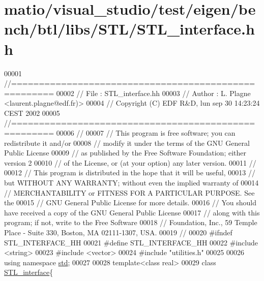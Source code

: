 \hypertarget{matio_2visual__studio_2test_2eigen_2bench_2btl_2libs_2_s_t_l_2_s_t_l__interface_8hh_source}{}\section{matio/visual\+\_\+studio/test/eigen/bench/btl/libs/\+S\+T\+L/\+S\+T\+L\+\_\+interface.hh}
\label{matio_2visual__studio_2test_2eigen_2bench_2btl_2libs_2_s_t_l_2_s_t_l__interface_8hh_source}

\begin{DoxyCode}
00001 \textcolor{comment}{//=====================================================}
00002 \textcolor{comment}{// File   :  STL\_interface.hh}
00003 \textcolor{comment}{// Author :  L. Plagne <laurent.plagne@edf.fr)>}
00004 \textcolor{comment}{// Copyright (C) EDF R&D,  lun sep 30 14:23:24 CEST 2002}
00005 \textcolor{comment}{//=====================================================}
00006 \textcolor{comment}{//}
00007 \textcolor{comment}{// This program is free software; you can redistribute it and/or}
00008 \textcolor{comment}{// modify it under the terms of the GNU General Public License}
00009 \textcolor{comment}{// as published by the Free Software Foundation; either version 2}
00010 \textcolor{comment}{// of the License, or (at your option) any later version.}
00011 \textcolor{comment}{//}
00012 \textcolor{comment}{// This program is distributed in the hope that it will be useful,}
00013 \textcolor{comment}{// but WITHOUT ANY WARRANTY; without even the implied warranty of}
00014 \textcolor{comment}{// MERCHANTABILITY or FITNESS FOR A PARTICULAR PURPOSE.  See the}
00015 \textcolor{comment}{// GNU General Public License for more details.}
00016 \textcolor{comment}{// You should have received a copy of the GNU General Public License}
00017 \textcolor{comment}{// along with this program; if not, write to the Free Software}
00018 \textcolor{comment}{// Foundation, Inc., 59 Temple Place - Suite 330, Boston, MA  02111-1307, USA.}
00019 \textcolor{comment}{//}
00020 \textcolor{preprocessor}{#ifndef STL\_INTERFACE\_HH}
00021 \textcolor{preprocessor}{#define STL\_INTERFACE\_HH}
00022 \textcolor{preprocessor}{#include <string>}
00023 \textcolor{preprocessor}{#include <vector>}
00024 \textcolor{preprocessor}{#include "utilities.h"}
00025 
00026 \textcolor{keyword}{using namespace }\hyperlink{namespacestd}{std};
00027 
00028 \textcolor{keyword}{template}<\textcolor{keyword}{class} real>
00029 \textcolor{keyword}{class }\hyperlink{class_s_t_l__interface}{STL\_interface}\{

\end{DoxyCode}
